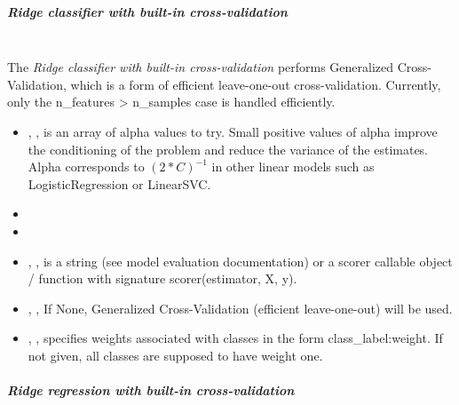 \subparagraph{Ridge classifier with built-in cross-validation}
\mbox{}
\\The \textit{Ridge classifier with built-in cross-validation} performs
Generalized Cross-Validation, which is a form of efficient leave-one-out
cross-validation.
%
Currently, only the n\_features > n\_samples case is handled efficiently.
%
\begin{itemize}
  \item {}, , is an
  array of alpha values to try.
  Small positive values of alpha improve the conditioning of the problem and
  reduce the variance of the estimates.
  Alpha corresponds to $(2*C)^{-1}$ in other linear models such as
  LogisticRegression or LinearSVC.
  \item {}
  \item {}
  \item {}, , is a
  string (see model evaluation documentation) or a scorer callable object /
  function with signature scorer(estimator, X, y).
  \item {}, ,
  If None, Generalized Cross-Validation (efficient leave-one-out) will be used.
  \item {}, , specifies 
  weights associated with classes in the form {class\_label:weight}.
  If not given, all classes are supposed to have weight one.
\end{itemize}

\subparagraph{Ridge regression with built-in cross-validation}
\mbox{}

